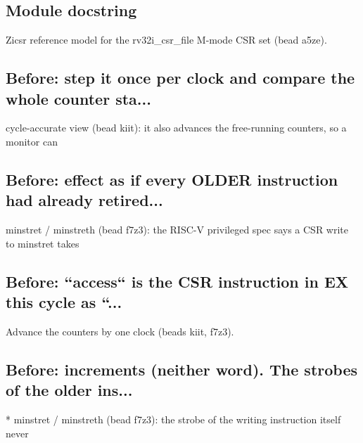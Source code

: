 \begin{record}

\subsection*{Module docstring}

\begin{textblock}
Zicsr reference model for the rv32i_csr_file M-mode CSR set (bead a5ze).
\end{textblock}

\subsection*{Before: step it once per clock and compare the whole counter sta...}

\begin{textblock}
cycle-accurate view (bead kiit): it also advances the free-running counters, so a monitor can
\end{textblock}

\subsection*{Before: effect as if every OLDER instruction had already retired...}

\begin{textblock}
minstret / minstreth (bead f7z3): the RISC-V privileged spec says a CSR write to minstret takes
\end{textblock}

\subsection*{Before: ``access`` is the CSR instruction in EX this cycle as ``...}

\begin{textblock}
Advance the counters by one clock (beads kiit, f7z3).
\end{textblock}

\subsection*{Before: increments (neither word).  The strobes of the older ins...}

\begin{textblock}
* minstret / minstreth (bead f7z3): the strobe of the writing instruction itself never
\end{textblock}

\end{record}

